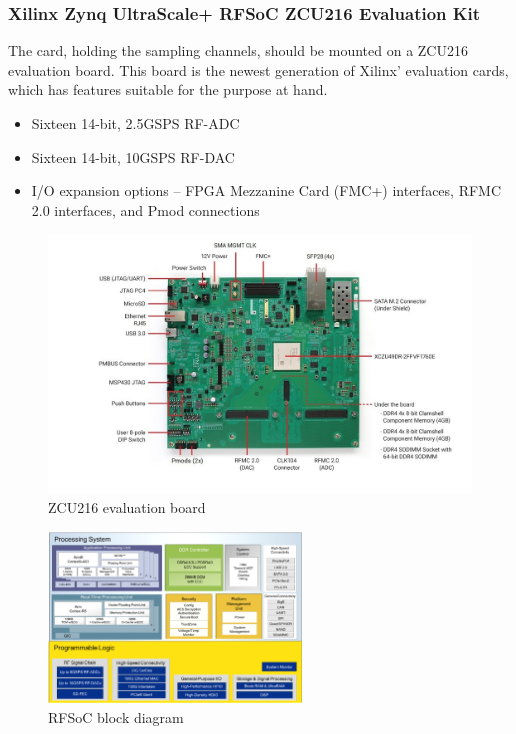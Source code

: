 \subsubsection{Xilinx Zynq UltraScale+ RFSoC ZCU216 Evaluation Kit}
The card, holding the sampling channels, should be mounted on a ZCU216 evaluation board. This board is the newest generation of Xilinx' evaluation cards, which has features suitable for the purpose at hand.
\begin{itemize}
\item Sixteen 14-bit, 2.5GSPS RF-ADC
\item Sixteen 14-bit, 10GSPS RF-DAC
\item I/O expansion options – FPGA Mezzanine Card (FMC+) interfaces, RFMC 2.0 interfaces, and Pmod connections
\end{itemize}
\begin{figure}[H]
	\centering
	\includegraphics[width = \textwidth]{chap/03-work/img/zcu216.png}
	\caption{ZCU216 evaluation board}
	\label{fig:zcu216}
\end{figure}
 
\begin{figure}[H]
	\centering
	\includegraphics[width = 0.6\textwidth]{chap/03-work/img/rfsoc_blockdiagram.png}
	\caption{RFSoC block diagram}
	\label{fig:rfsoc}
\end{figure}

